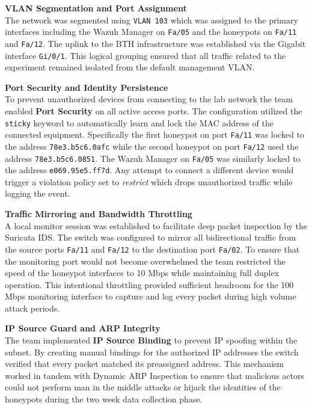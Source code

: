 \documentclass[11pt,a4paper]{article}
\newcommand{\techterm}[1]{\texttt{#1}}
\begin{document}
\textbf{VLAN Segmentation and Port Assignment} \\
The network was segmented using \techterm{VLAN 103} which was assigned to the primary interfaces including the Wazuh Manager on \techterm{Fa/05} and the honeypots on \techterm{Fa/11} and \techterm{Fa/12}. The uplink to the BTH infrastructure was established via the Gigabit interface \techterm{Gi/0/1}. This logical grouping ensured that all traffic related to the experiment remained isolated from the default management VLAN.

\textbf{Port Security and Identity Persistence} \\
To prevent unauthorized devices from connecting to the lab network the team enabled \textbf{Port Security} on all active access ports. The configuration utilized the \techterm{sticky} keyword to automatically learn and lock the MAC address of the connected equipment. Specifically the first honeypot on port \techterm{Fa/11} was locked to the address \texttt{78e3.b5c6.0afc} while the second honeypot on port \techterm{Fa/12} used the address \texttt{78e3.b5c6.0851}. The Wazuh Manager on \techterm{Fa/05} was similarly locked to the address \texttt{e069.95e5.ff7d}. Any attempt to connect a different device would trigger a violation policy set to \textit{restrict} which drops unauthorized traffic while logging the event.

\textbf{Traffic Mirroring and Bandwidth Throttling} \\
A local monitor session was established to facilitate deep packet inspection by the Suricata IDS. The switch was configured to mirror all bidirectional traffic from the source ports \techterm{Fa/11} and \techterm{Fa/12} to the destination port \techterm{Fa/02}. To ensure that the monitoring port would not become overwhelmed the team restricted the speed of the honeypot interfaces to 10 Mbps while maintaining full duplex operation. This intentional throttling provided sufficient headroom for the 100 Mbps monitoring interface to capture and log every packet during high volume attack periods.

\textbf{IP Source Guard and ARP Integrity} \\
The team implemented \textbf{IP Source Binding} to prevent IP spoofing within the subnet. By creating manual bindings for the authorized IP addresses the switch verified that every packet matched its preassigned address. This mechanism worked in tandem with Dynamic ARP Inspection to ensure that malicious actors could not perform man in the middle attacks or hijack the identities of the honeypots during the two week data collection phase.
\end{document}
